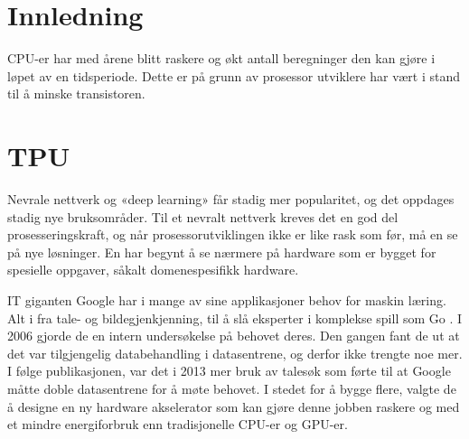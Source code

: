 \begin{titlepage}
	
	
	
	
	 
	
	\vfill %
	
\end{titlepage}
\newpage
\tableofcontents
\newpage

\section{Innledning}
CPU-er har med årene blitt raskere og økt antall beregninger den kan gjøre i løpet av en tidsperiode. Dette er på grunn av prosessor utviklere har vært i stand til å minske transistoren.

\section{TPU}
Nevrale nettverk og «deep learning» får stadig mer popularitet, og det oppdages stadig nye bruksområder. Til et nevralt nettverk kreves det en god del prosesseringskraft, og når prosessorutviklingen ikke er like rask som før, må en se på nye løsninger. En har begynt å se nærmere på hardware som er bygget for spesielle oppgaver, såkalt domenespesifikk hardware. 

IT giganten Google har i mange av sine applikasjoner behov for maskin læring. Alt i fra tale- og bildegjenkjenning, til å slå eksperter i komplekse spill som Go \cite{look_at_TPU}. I 2006 gjorde de en intern undersøkelse på behovet deres. Den gangen fant de ut at det var tilgjengelig databehandling i datasentrene, og derfor ikke trengte noe mer. I følge publikasjonen, var det i 2013 mer bruk av talesøk som førte til at Google måtte doble datasentrene for å møte behovet. I stedet for å bygge flere, valgte de å designe en ny hardware akselerator som kan gjøre denne jobben raskere og med et mindre energiforbruk enn tradisjonelle CPU-er og GPU-er.

